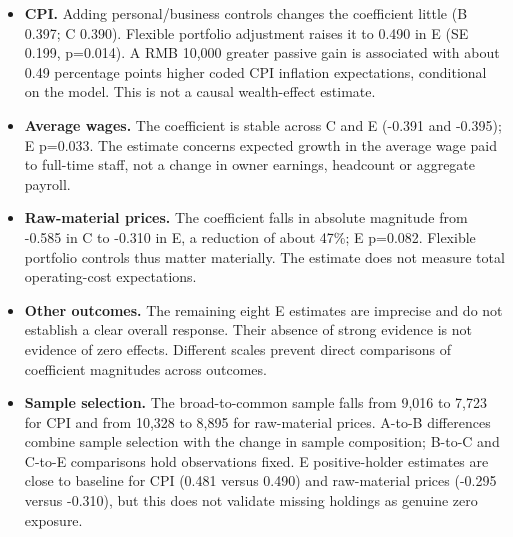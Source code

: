 \begin{itemize}
\item \textbf{CPI.} Adding personal/business controls changes the coefficient little (B 0.397; C 0.390). Flexible portfolio adjustment raises it to 0.490 in E (SE 0.199, p=0.014). A RMB 10,000 greater passive gain is associated with about 0.49 percentage points higher coded CPI inflation expectations, conditional on the model. This is not a causal wealth-effect estimate.

\item \textbf{Average wages.} The coefficient is stable across C and E (-0.391 and -0.395); E p=0.033. The estimate concerns expected growth in the average wage paid to full-time staff, not a change in owner earnings, headcount or aggregate payroll.

\item \textbf{Raw-material prices.} The coefficient falls in absolute magnitude from -0.585 in C to -0.310 in E, a reduction of about 47\%; E p=0.082. Flexible portfolio controls thus matter materially. The estimate does not measure total operating-cost expectations.

\item \textbf{Other outcomes.} The remaining eight E estimates are imprecise and do not establish a clear overall response. Their absence of strong evidence is not evidence of zero effects. Different scales prevent direct comparisons of coefficient magnitudes across outcomes.

\item \textbf{Sample selection.} The broad-to-common sample falls from 9,016 to 7,723 for CPI and from 10,328 to 8,895 for raw-material prices. A-to-B differences combine sample selection with the change in sample composition; B-to-C and C-to-E comparisons hold observations fixed. E positive-holder estimates are close to baseline for CPI (0.481 versus 0.490) and raw-material prices (-0.295 versus -0.310), but this does not validate missing holdings as genuine zero exposure.
\end{itemize}

